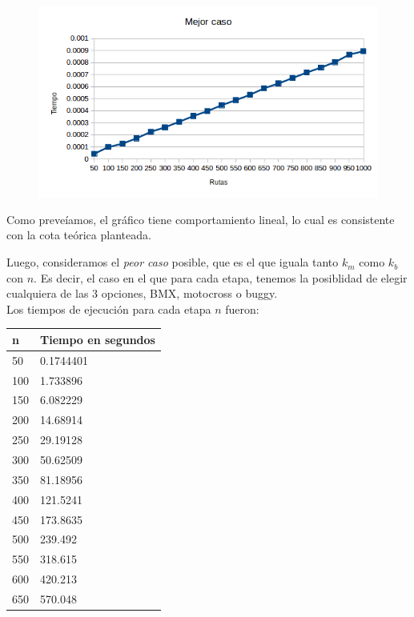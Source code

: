 \newpage
	
  \begin{figure}[h!]
   \begin{center}
 	\includegraphics[scale=0.8]{imagenes/ej1/mejorCaso.png}
   \end{center}
 \end{figure}
 
  Como preve\'iamos, el gr\'afico tiene comportamiento lineal, lo cual es consistente con la cota te\'orica planteada.
  
  \newpage
   
  Luego, consideramos el \emph{peor caso} posible, que es el que iguala tanto $k_m$ como $k_b$ con $n$.
  Es decir, el caso en el que para cada etapa, tenemos la posiblidad de elegir cualquiera de las 3 opciones, BMX, motocross o buggy.\\
  

  
  Los tiempos de ejecuci\'on para cada etapa $n$ fueron:
  
  \begin{table}[htb]
  \centering
  \begin{tabular}[c]{|l|l|}

		\hline
n & Tiempo en segundos\\
		\hline
50	&	0.1744401\\
		\hline
100	&	1.733896\\
		\hline
150	&	6.082229\\
		\hline
200	&	14.68914\\
		\hline
250	&	29.19128\\
		\hline
300	&	50.62509\\
		\hline
350	&	81.18956\\
		\hline
400	&	121.5241\\
		\hline
450	&	173.8635\\
		\hline
500	&	239.492\\
		\hline
550	&	318.615\\
		\hline
600	&	420.213\\
		\hline
650	&	570.048\\
		\hline

	\end{tabular}
	\end{table}
	
